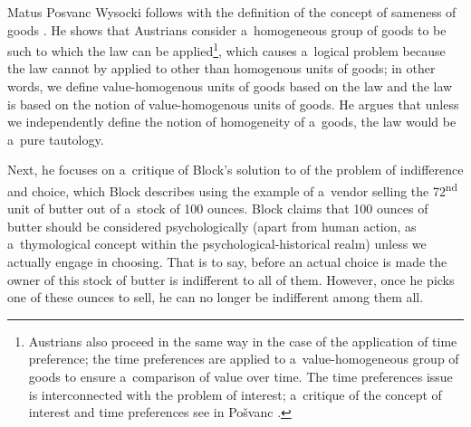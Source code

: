 \begin{artengenv}{Matus Posvanc}
Wysocki follows with the definition of the concept of sameness of goods 
\parencite[][pp.16, 20–21]{wysocki_problem_2021}. %
 He shows that Austrians consider a~homogeneous group of goods to be such to which the law can be applied\footnote{Austrians also proceed in the same way in the case of the application of time preference; the time preferences are applied to a~value-homogeneous group of goods to ensure a~comparison of value over time. The time preferences issue is interconnected with the problem of interest; a~critique of the concept of interest and time preferences see in Pošvanc 
\parencite*[][]{Posvanc2019Evolutionary}.%
}, which causes a~logical problem because the law cannot by applied to other than homogenous units of goods; in other words, we define value-homogenous units of goods based on the law and the law is based on the notion of value-homogenous units of goods. He argues that unless we independently define the notion of homogeneity of a~goods, the law would be a~pure tautology.



Next, he focuses on a~critique of Block's solution to of the problem of indifference and choice, which Block 
\parencite*[][]{Block1980On} %
 describes using the example of a~vendor selling the 72\textsuperscript{nd} unit of butter out of a~stock of 100 ounces. Block 
\parencite*[][]{Block2009Rejoinder} %
 claims that 100 ounces of butter should be considered psychologically (apart from human action, as a~thymological concept within the psychological-historical realm) unless we actually engage in choosing. That is to say, before an actual choice is made the owner of this stock of butter is indifferent to all of them. However, once he picks one of these ounces to sell, he can no longer be indifferent among them all.




\end{artengenv}

